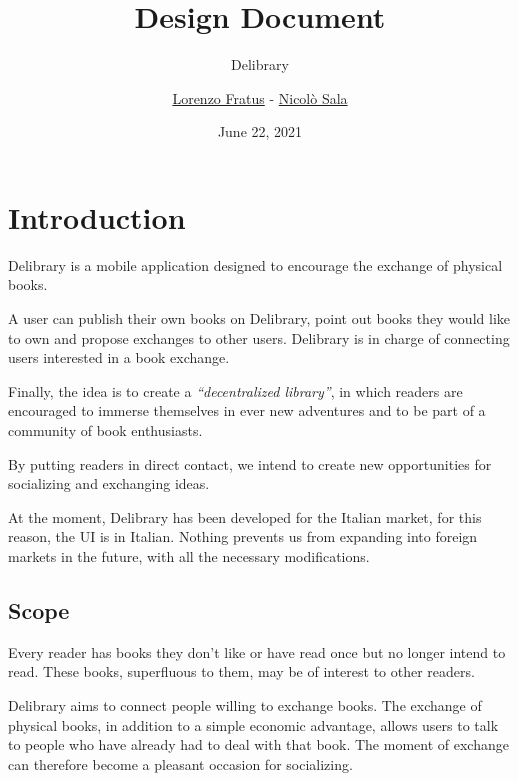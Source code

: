 
\graphicspath{ {assets/} }

\title{Design Document}
\subtitle{Delibrary}
\author{\href{https://github.com/lorenzofratus}{Lorenzo Fratus} - \href{https://github.com/nicheosala}{Nicolò Sala}}
\date{June 22, 2021}



\maketitle
\tableofcontents



\chapter{Introduction}
Delibrary is a mobile application designed to encourage the exchange of physical books.

A user can publish their own books on Delibrary, point out books they would like to own and propose exchanges to other users.
Delibrary is in charge of connecting users interested in a book exchange.

Finally, the idea is to create a \textit{``decentralized library''}, in which readers are encouraged to immerse themselves
in ever new adventures and to be part of a community of book enthusiasts.

By putting readers in direct contact, we intend to create new opportunities for socializing and exchanging ideas.

At the moment, Delibrary has been developed for the Italian market, for this reason, the UI is in Italian.
Nothing prevents us from expanding into foreign markets in the future, with all the necessary modifications.

\section{Scope}
Every reader has books they don't like or have read once but no longer intend to read.
These books, superfluous to them, may be of interest to other readers.

Delibrary aims to connect people willing to exchange books.
The exchange of physical books, in addition to a simple economic advantage, allows users to talk to people who have already had to deal with that book.
The moment of exchange can therefore become a pleasant occasion for socializing.

